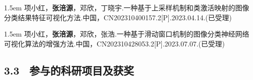 \hangindent 1.5em
\noindent
[1]项小红，\textbf{张涪源}，邓欣，丁晓宇.一种基于上采样机制和类激活映射的图像分类结果特征可视化方法.中国，CN202310400157.2[P].2023.04.14.(已受理)

\hangindent 1.5em
\noindent
[2] 项小红，\textbf{张涪源}，邓欣，张浩.一种基于滑动窗口机制的图像分类神经网络可视化算法的增强方法.中国，CN202310428053.2[P].2023.07.07.(已受理)


\subsection{3.3 \ 参与的科研项目及获奖}






